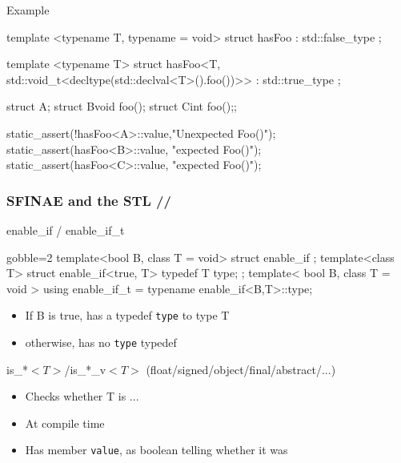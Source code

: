 \begin{frame}[fragile]
    \begin{exampleblock}{Example}
      \begin{cppcode*}{}
      template <typename T, typename = void>
      struct hasFoo : std::false_type {};

      template <typename T>
      struct hasFoo<T,
         std::void_t<decltype(std::declval<T>().foo())>>
      : std::true_type {};

      struct A{}; struct B{void foo()};
      struct C{int foo();};

      static_assert(!hasFoo<A>::value,"Unexpected Foo()");
      static_assert(hasFoo<B>::value, "expected Foo()");
      static_assert(hasFoo<C>::value, "expected Foo()");
      \end{cppcode*}
    \end{exampleblock}
\end{frame}

\begin{frame}[fragile]
  \frametitle{SFINAE and the STL \hfill {}//}
  \begin{block}{enable\_if / enable\_if\_t}
    \begin{cppcode*}{gobble=2}
      template<bool B, class T = void> struct enable_if {};
      template<class T>
      struct enable_if<true, T> { typedef T type; };
      template< bool B, class T = void >
      using enable_if_t = typename enable_if<B,T>::type;
    \end{cppcode*}
    \begin{itemize}
    \item If B is true, has a typedef \texttt{type} to type T
    \item otherwise, has no \texttt{type} typedef
    \end{itemize}
  \end{block}
  \begin{block}{is\_*$<T>$/is\_*\_v$<T>$ (float/signed/object/final/abstract/...)}
    \begin{itemize}
    \item Checks whether T is ...
    \item At compile time
    \item Has member \texttt{value}, as boolean telling whether it was
    \end{itemize}
  \end{block}
\end{frame}

